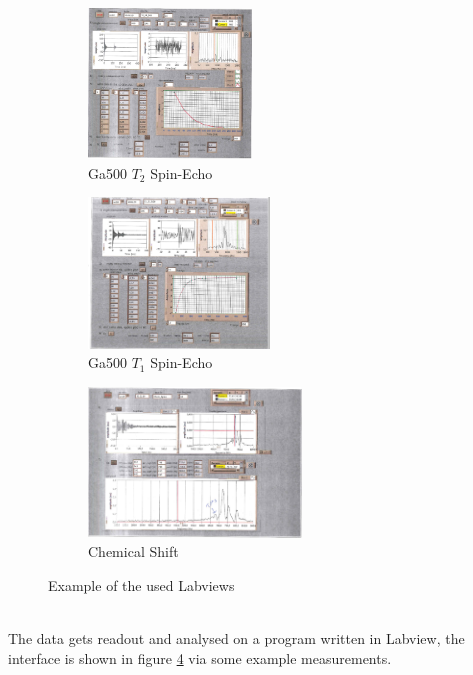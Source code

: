 \begin{figure}[h!]
	\begin{subfigure}{0.32\textwidth}
	\includegraphics[width=0.9\linewidth ,height=4cm]{images/LabView1.png}
	\caption{Ga500 $T_2$ Spin-Echo}
	\label{Lab1}
	\end{subfigure}
	\begin{subfigure}{0.32\textwidth}
	\includegraphics[width=0.9\linewidth ,height=4cm]{images/LabView3.png}
	\caption{Ga500 $T_1$ Spin-Echo}
	\label{Lab3}
	\end{subfigure}
	\begin{subfigure}{0.32\textwidth}
	\includegraphics[width=0.9\linewidth, height=4cm]{images/LabView2.png}
	\caption{Chemical Shift}
	\label{Lab2}
	\end{subfigure}
	\caption{Example of the used Labviews}
	\label{exa}
\end{figure}\\
The data gets readout and analysed on a program written in Labview, the interface is shown in figure \ref{exa} via some example measurements.

